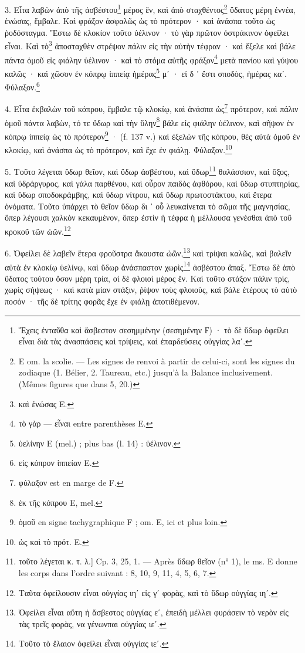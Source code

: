 \documentclass[a4paper, 11pt, oneside, polutonikogreek, french]{article}
\begin{document}
3. Εἶτα λαβὼν ἀπὸ τῆς ἀσβέστου\footnote{Ἔχεις ἐνταῦθα καὶ ἄσβεστον σεσημμένην (σεσημένην Ϝ) · τὸ δὲ ὕδωρ ὀφείλει εἶναι διὰ τὰς ἀνασπάσεις καὶ τρίψεις, καὶ ἐπαρδεύσεις οὐγγίας λαʹ.} μέρος ἓν, καὶ ἀπὸ σταχθέντος\footnote{E om. la scolie. --- Les signes de renvoi à partir de celui-ci, sont les signes du zodiaque (1. Bélier, 2. Taureau, etc.) jusqu'à la Balance inclusivement. (Mêmes figures que dans 5, 20.)} ὕδατος μέρη ἐννέα, ἑνώσας, ἔμβαλε. Καὶ φράξον ἀσφαλῶς ὡς τὸ πρότερον · καὶ ἀνάσπα τοῦτο ὡς ῥοδόσταγμα. Ἔστω δὲ κλοκίον τοῦτο ὑέλινον · τὸ γὰρ πρῶτον ὀστράκινον ὀφείλει εἶναι. Καὶ τὸ\footnote{καὶ ἑνώσας E.} ἀποσταχθὲν στρέψον πάλιν εἰς τὴν αὐτὴν τέφραν · καὶ ἔξελε καὶ βάλε πάντα ὁμοῦ εἰς φιάλην ὑέλινον · καὶ τὸ στόμα αὐτῆς φράξον\footnote{τὸ γὰρ --- εἶναι entre parenthèses E.} μετὰ πανίου καὶ γύψου καλῶς · καὶ χῶσον ἐν κόπρῳ ἱππείᾳ ἡμέρας\footnote{ὑελίνην E (mel.) ; plus bas (l. 14) : ὑέλινον.} μʹ · εἰ δ ᾽ ἔστι σποδὸς, ἡμέρας καʹ. Φύλαξον.\footnote{εἰς κόπρον ἱππείαν E.}

4. Εἶτα ἐκβαλὼν τοῦ κόπρου, ἔμβαλε τῷ κλοκίῳ, καὶ ἀνάσπα ὡς\footnote{φύλαξον est en marge de F.} πρότερον, καὶ πάλιν ὁμοῦ πάντα λαβὼν, τό τε ὕδωρ καὶ τὴν ὕλην\footnote{ἐκ τῆς κόπρου E, mel.} βάλε εἰς φιάλην ὑέλινον, καὶ σῆψον ἐν κόπρῳ ἱππείᾳ ὡς τὸ πρότερον\footnote{ὁμοῦ en signe tachygraphique F ; om. E, ici et plus loin.} · (f. 137 v.) καὶ ἐξελὼν τῆς κόπρου, θὲς αὐτὰ ὁμοῦ ἐν κλοκίῳ, καὶ ἀνάσπα ὡς τὸ πρότερον, καὶ ἔχε ἐν φιάλῃ. Φύλαξον.\footnote{ὡς καὶ τὸ πρότ. E.}

5. Τοῦτο λέγεται ὕδωρ θεῖον, καὶ ὕδωρ ἀσβέστου, καὶ ὕδωρ\footnote{τοῦτο λέγεται κ. τ. λ.] Cp. 3, 25, 1. --- Après ὕδωρ θεῖον (n° 1), le ms. E donne les corps dans l'ordre suivant : 8, 10, 9, 11, 4, 5, 6, 7.} θαλάσσιον, καὶ ὄξος, καὶ ὑδράργυρος, καὶ γάλα παρθένου, καὶ οὖρον παιδὸς ἀφθόρου, καὶ ὕδωρ στυπτηρίας, καὶ ὕδωρ σποδοκράμβης, καὶ ὕδωρ νίτρου, καὶ ὕδωρ πρωτοστάκτου, καὶ ἕτερα ὀνόματα. Τοῦτο ὑπάρχει τὸ θεῖον ὕδωρ δι ᾽ οὗ λευκαίνεται τὸ σῶμα τῆς μαγνησίας, ὅπερ λέγουσι χαλκὸν κεκαυμένον, ὅπερ ἐστὶν ἡ τέφρα ἡ μέλλουσα γενέσθαι ἀπὸ τοῦ κροκοῦ τῶν ὠῶν.\footnote{Ταῦτα ὀφείλουσιν εἶναι οὐγγίας ιηʹ εἰς γʹ φορὰς, καὶ τὸ ὕδωρ οὐγγίας ιηʹ.}

6. Ὀφείλει δὲ λαβεῖν ἕτερα φροῦστρα ἄκαυστα ὠῶν,\footnote{Ὀφείλει εἶναι αὕτη ἡ ἄσβεστος οὐγγίας εʹ, ἐπειδὴ μέλλει φυράσειν τὸ νερὸν εἰς τὰς τρεῖς φορὰς, να γένωνπαι οὐγγίας ιεʹ.} καὶ τρίψαι καλῶς, καὶ βαλεῖν αὐτὰ ἐν κλοκίῳ ὑελίνῳ, καὶ ὕδωρ ἀνάσπαστον χωρὶς\footnote{Τοῦτο τὸ ἔλαιον ὀφείλει εἶναι οὐγγίας ιεʹ.} ἀσβέστου ἅπαξ. Ἔστω δὲ ἀπὸ ὕδατος τούτου ὅσον μέρη τρία, οἱ δὲ φλοιοὶ μέρος ἕν. Καὶ τοῦτο στάξον πάλιν τρὶς, χωρὶς σήψεως · καὶ κατὰ μίαν στάξιν, ῥίψον τοὺς φλοιοὺς, καὶ βάλε ἑτέρους τὸ αὐτὸ ποσόν · τῆς δὲ τρίτης φορᾶς ἔχε ἐν φιάλῃ ἀποτιθέμενον.
\end{document}
